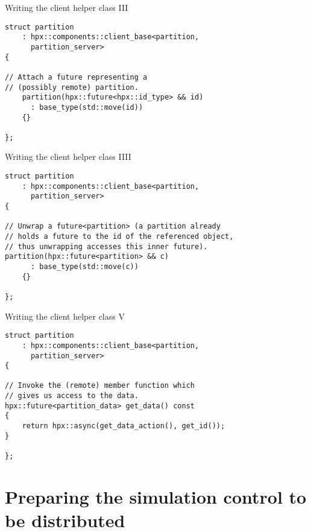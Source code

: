 \documentclass[12pt,t]{beamer}
\begin{document}
\begin{frame}[fragile]{Writing the client helper class III}

\begin{lstlisting}
struct partition 
	: hpx::components::client_base<partition, 
	  partition_server>
{

// Attach a future representing a 
// (possibly remote) partition.
    partition(hpx::future<hpx::id_type> && id)
      : base_type(std::move(id))
    {}
    
};
\end{lstlisting}

\end{frame}

\begin{frame}[fragile]{Writing the client helper class IIII}

\begin{lstlisting}
struct partition 
	: hpx::components::client_base<partition, 
	  partition_server>
{

// Unwrap a future<partition> (a partition already 
// holds a future to the id of the referenced object, 
// thus unwrapping accesses this inner future).
partition(hpx::future<partition> && c)
      : base_type(std::move(c))
    {}

};
\end{lstlisting}

\end{frame}

\begin{frame}[fragile]{Writing the client helper class V}

\begin{lstlisting}
struct partition 
	: hpx::components::client_base<partition, 
	  partition_server>
{

// Invoke the (remote) member function which 
// gives us access to the data.
hpx::future<partition_data> get_data() const
{
    return hpx::async(get_data_action(), get_id());
}

};
\end{lstlisting}

\end{frame}

\section{Preparing the simulation control to be distributed}
\end{document}
